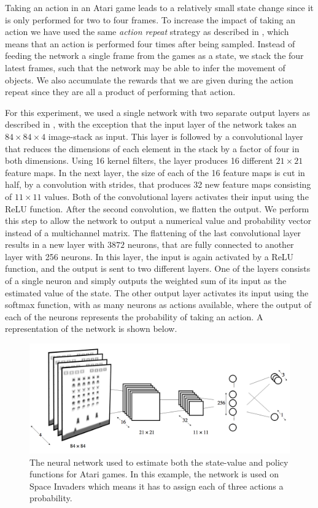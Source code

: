 \documentclass[11pt]{article}
\begin{document}
Taking an action in an Atari game leads to a relatively small state change
since it is only performed for two to four frames.
To increase the impact of taking an action we have used the same \textit{action repeat}
strategy as described in \cite{a3c}, which means that an action is performed four times
after being sampled.
Instead of feeding the network a single frame from the games as a state,
we stack the four latest frames, such that the network may be able
to infer the movement of objects.
We also accumulate the rewards that we are given during the action repeat
since they are all a product of performing that action.

For this experiment, we used a single network with two separate
output layers as described in \cite{a3c}, with the exception that
the input layer of the network takes an $84 \times 84 \times 4$
image-stack as input.
This layer is followed by a convolutional layer that reduces the dimensions
of each element in the stack by a factor of four in both dimensions.
Using 16 kernel filters, the layer produces 16 different
$21 \times 21$ feature maps.
In the next layer, the size of each of the 16 feature maps is
cut in half, by a convolution with strides, that produces 32 new feature maps consisting
of $11 \times 11$ values.
Both of the convolutional layers activates
their input using the ReLU function.
After the second convolution, we flatten the output.
We perform this step to allow the network to output a numerical value and
probability vector instead of a multichannel matrix.
The flattening of the last convolutional layer results in a new layer with $3872$ neurons,
that are fully connected to another layer with 256 neurons.
In this layer, the input is again activated by a ReLU function,
and the output is sent to two different layers.
One of the layers consists of a single neuron
and simply outputs the weighted sum of its input as the estimated value
of the state.
The other output layer activates its input using the softmax function,
with as many neurons as actions available,
where the output of each of the neurons represents the probability of taking an action.
A representation of the network is shown below.

\begin{figure}[H]
    \centering
    \includegraphics[scale=0.25]{include/Atari_network.png}
    \caption{The neural network used to estimate both the state-value
             and policy functions for Atari games. In this example, the network
             is used on Space Invaders which means it has to assign each of three actions a probability.}
    \label{fig:atari_network}
\end{figure}
\end{document}
